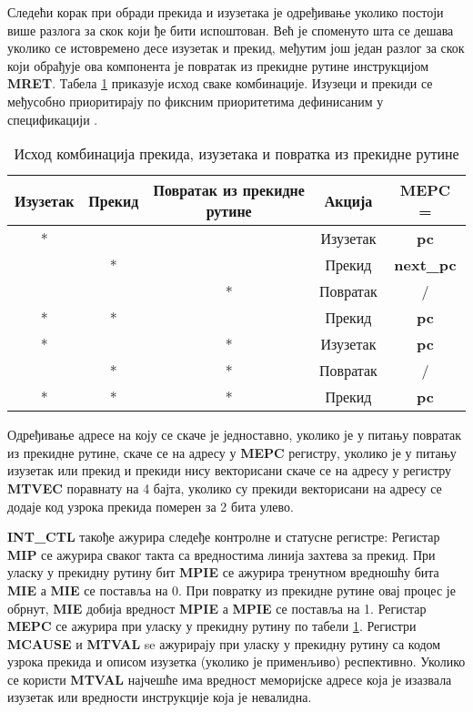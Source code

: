 Следећи корак при обради прекида и изузетака је одређивање уколико постоји више разлога за скок који ђе бити испоштован. Већ је споменуто шта се дешава уколико се истовремено десе изузетак и прекид, међутим још један разлог за скок који обрађује ова компонента је повратак из прекидне рутине инструкцијом \textbf{MRET}. Табела \ref{tab:int} приказује исход сваке комбинације. Изузеци и прекиди се међусобно приоритирају по фиксним приоритетима дефинисаним у спецификацији \cite{priv_spec}.

\begin{table}[h!]
	\centering
	\caption{Исход комбинација прекида, изузетака и повратка из прекидне рутине}
	\label{tab:int}
\begin{tabular}{|c|c|c|c|c|}
	\hline
	Изузетак & Прекид & Повратак из прекидне рутине & Акција & \textbf{\acrshort{MEPC}} = \\
	\hline
	* &  &  & Изузетак & \textbf{pc} \\
	\hline
	& * &  & Прекид & \textbf{next\_pc} \\
	\hline
	&  & * & Повратак & / \\
	\hline
	* & * &  & Прекид & \textbf{pc} \\
	\hline
	* &  & * & Изузетак & \textbf{pc} \\
	\hline
	& * & * & Повратак & / \\
	\hline
	* & * & * & Прекид & \textbf{pc} \\
	\hline
\end{tabular}
\end{table}

Одређивање адресе на коју се скаче је једноставно, уколико је у питању повратак из прекидне рутине, скаче се на адресу у \textbf{\acrshort{MEPC}} регистру, уколико је у питању изузетак или прекид и прекиди нису векторисани скаче се на адресу у регистру \textbf{MTVEC} поравнату на 4 бајта, уколико су прекиди векторисани на адресу се додаје код узрока прекида померен за 2 бита улево.

\textbf{INT\_CTL} такође ажурира следеђе контролне и статусне регистре:
Регистар \textbf{\acrshort{MIP}} се ажурира сваког такта са вредностима линија захтева за прекид.
При уласку у прекидну рутину бит \textbf{\acrshort{MPIE}} се ажурира тренутном вредношћу бита \textbf{\acrshort{MIE}} а \textbf{\acrshort{MIE}} се поставља на 0.
При повратку из прекидне рутине овај процес је обрнут, \textbf{\acrshort{MIE}} добија вредност \textbf{\acrshort{MPIE}} а \textbf{\acrshort{MPIE}} се поставља на 1.
Регистар \textbf{\acrshort{MEPC}} се ажурира при уласку у прекидну рутину по табели \ref{tab:int}.
Регистри \textbf{\acrshort{MCAUSE}} и \textbf{\acrshort{MTVAL}} se ажурирају при уласку у прекидну рутину са кодом узрока прекида и описом изузетка (уколико је применљиво) респективно.
Уколико се користи \textbf{\acrshort{MTVAL}} најчешће има вредност меморијске адресе која је изазвала изузетак или вредности инструкције која је невалидна.